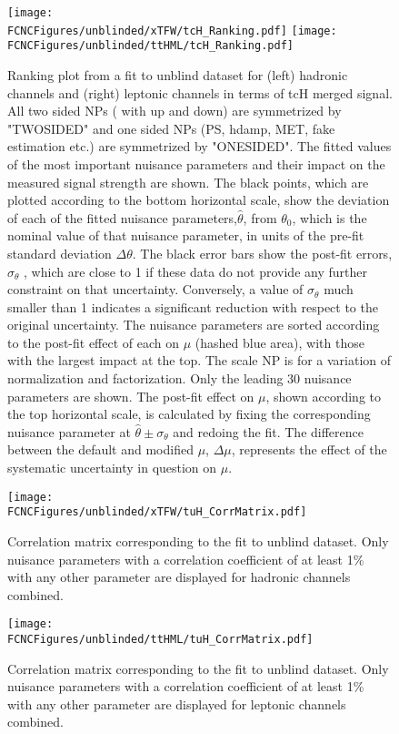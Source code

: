 \begin{figure}[htb]
\centering
\texttt{[image: \\FCNCFigures/unblinded/xTFW/tcH\_Ranking.pdf]}
\texttt{[image: \\FCNCFigures/unblinded/ttHML/tcH\_Ranking.pdf]}
\caption{ Ranking plot from a fit to unblind dataset for (left) hadronic channels and (right)
leptonic channels in terms of tcH merged signal. All two sided NPs ( with up and down) are symmetrized by "TWOSIDED" and one sided NPs (PS, hdamp, MET, fake estimation etc.) are symmetrized by "ONESIDED". The fitted values of the most important nuisance parameters and their impact on the measured
signal strength are shown. The black points, which are plotted according to the bottom horizontal scale, show the deviation
of each of the fitted nuisance parameters,$\hat{\theta}$, from $\theta_{0}$, which is the nominal value of that nuisance parameter, in units of the
pre-fit standard deviation $\Delta\theta$. The black error bars show the post-fit errors, $\sigma_{\theta}$ , which are close to 1 if these data do not
provide any further constraint on that uncertainty. Conversely, a value of $\sigma_{\theta}$ much smaller than 1 indicates a significant
reduction with respect to the original uncertainty. The nuisance parameters are sorted according to the post-fit effect of each on $\mu$ (hashed blue area),
with those with the largest impact at the top. The scale NP is for a variation of normalization and factorization. Only the leading 30 nuisance parameters are shown. The post-fit effect on $\mu$,
shown according to the top horizontal scale, is calculated by fixing the corresponding nuisance parameter at $\hat{\theta}\pm \sigma_{\theta}$ and
redoing the fit. The difference between the default and modified $\mu$, $\Delta\mu$, represents the effect of the systematic uncertainty
in question on $\mu$.}
\label{fig:fcnc_rank_data_tcH}
\end{figure}


\begin{figure}[htb]
\centering
\texttt{[image: \\FCNCFigures/unblinded/xTFW/tuH\_CorrMatrix.pdf]}
\caption{ Correlation matrix corresponding to the fit to unblind dataset. Only nuisance parameters with a correlation coefficient of at least 1\% with any other parameter are displayed for hadronic channels combined.}
\label{fig:fcnc_correl_data_1}
\end{figure}


\begin{figure}[htb]
\centering
\texttt{[image: \\FCNCFigures/unblinded/ttHML/tuH\_CorrMatrix.pdf]}
\caption{ Correlation matrix corresponding to the fit to unblind dataset. Only nuisance parameters with a correlation coefficient of at least 1\% with any other parameter are displayed for leptonic channels combined.}
\label{fig:fcnc_correl_data_2}
\end{figure}
















